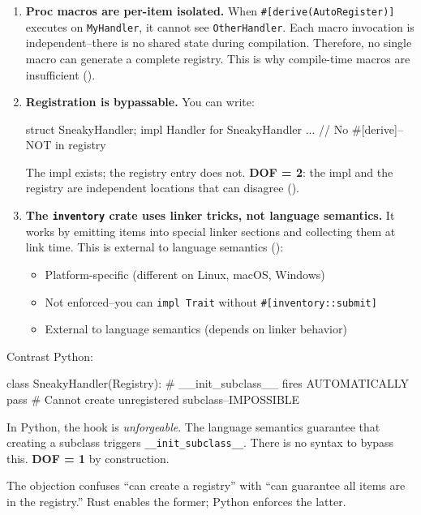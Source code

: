 \begin{enumerate}
\item \textbf{Proc macros are per-item isolated.} When \texttt{\#[derive(AutoRegister)]} executes on \texttt{MyHandler}, it cannot see \texttt{OtherHandler}. Each macro invocation is independent--there is no shared state during compilation. Therefore, no single macro can generate a complete registry. This is why compile-time macros are insufficient ().

\item \textbf{Registration is bypassable.} You can write:
\begin{code}
struct SneakyHandler;
impl Handler for SneakyHandler { ... }  // No #[derive]--NOT in registry
\end{code}
The impl exists; the registry entry does not. \textbf{DOF = 2}: the impl and the registry are independent locations that can disagree ().

\item \textbf{The \texttt{inventory} crate uses linker tricks, not language semantics.} It works by emitting items into special linker sections and collecting them at link time. This is external to language semantics ():
\begin{itemize}
\tightlist
\item Platform-specific (different on Linux, macOS, Windows)
\item Not enforced--you can \texttt{impl Trait} without \texttt{\#[inventory::submit]}
\item External to language semantics (depends on linker behavior)
\end{itemize}
\end{enumerate}

Contrast Python:
\begin{code}
class SneakyHandler(Registry):  # __init_subclass__ fires AUTOMATICALLY
    pass  # Cannot create unregistered subclass--IMPOSSIBLE
\end{code}

In Python, the hook is \emph{unforgeable}. The language semantics guarantee that creating a subclass triggers \texttt{\_\_init\_subclass\_\_}. There is no syntax to bypass this. \textbf{DOF = 1} by construction.

The objection confuses ``can create a registry'' with ``can guarantee all items are in the registry.'' Rust enables the former; Python enforces the latter.


